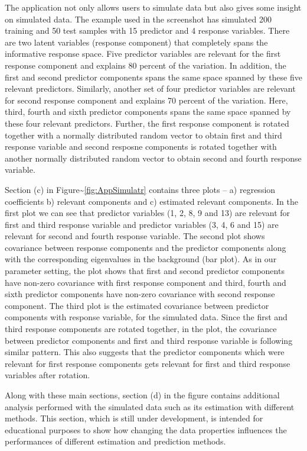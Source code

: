 \documentclass[12pt,A4paper,authoryear]{elsarticle} %
\theoremstyle{definition}
\theoremstyle{definition}
\theoremstyle{remark}
\begin{document}
The application not only allows users to simulate data but also gives
some insight on simulated data. The example used in the screenshot has
simulated 200 training and 50 test samples with 15 predictor and 4
response variables. There are two latent variables (response component)
that completely spans the informative response space. Five predictor
variables are relevant for the first response component and explains 80
percent of the variation. In addition, the first and second predictor
components spans the same space spanned by these five relevant
predictors. Similarly, another set of four predictor variables are
relevant for second response component and explains 70 percent of the
variation. Here, third, fourth and sixth predictor components spans the
same space spanned by these four relevant predictors. Further, the first
response component is rotated together with a normally distributed
random vector to obtain first and third response variable and second
resposne components is rotated together with another normally
distributed random vector to obtain second and fourth response variable.

Section (c) in Figure\textasciitilde{}\ref{fig:AppSimulatr} contains
three plots -- a) regression coefficients b) relevant components and c)
estimated relevant components. In the first plot we can see that
predictor variables (1, 2, 8, 9 and 13) are relevant for first and third
response variable and predictor variables (3, 4, 6 and 15) are relevant
for second and fourth response variable. The second plot shows
covariance between response components and the predictor components
along with the corresponding eigenvalues in the background (bar plot).
As in our parameter setting, the plot shows that first and second
predictor components have non-zero covariance with first response
component and third, fourth and sixth predictor components have non-zero
covariance with second response component. The third plot is the
estimated covariance between predictor components with response
variable, for the simulated data. Since the first and third response
components are rotated together, in the plot, the covariance between
predictor components and first and third response variable is following
similar pattern. This also suggests that the predictor components which
were relevant for first response components gets relevant for first and
third response variables after rotation.

Along with these main sections, section (d) in the figure contains
additional analysis performed with the simulated data such as its
estimation with different methods. This section, which is still under
development, is intended for educational purposes to show how changing
the data properties influences the performances of different estimation
and prediction methods.
\end{document}

